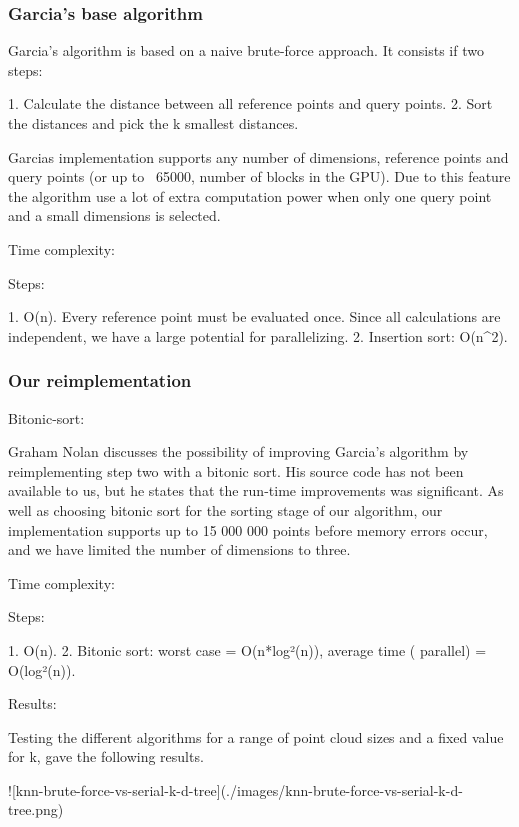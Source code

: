 \subsubsection{Garcia's base algorithm} %
\label{ssub:garcias_base_algorithme}

Garcia's algorithm is based on a naive brute-force approach. It consists if two steps:

1. Calculate the distance between all reference points and query points.
2. Sort the distances and pick the k smallest distances.

Garcias implementation supports any number of dimensions, reference points and query points (or up to ~65000, number of blocks in the GPU). Due to this feature the algorithm use a lot of extra computation power when only one query point and a small dimensions is selected.

Time complexity:

Steps:

1. O(n). Every reference point must be evaluated once. Since all calculations are independent, we have a large potential for parallelizing.
2. Insertion sort: O(n^2).

\subsubsection{Our reimplementation} %
\label{ssub:our_reimplementation}

Bitonic-sort:

Graham Nolan discusses the possibility of improving Garcia's algorithm by reimplementing step two with a bitonic sort. His source code has not been available to us, but he states that the run-time improvements was significant. As well as choosing bitonic sort for the sorting stage of our algorithm, our implementation supports up to 15 000 000 points before memory errors occur, and we have limited the number of dimensions to three.

Time complexity:

Steps:

1. O(n).
2. Bitonic sort: worst case = O(n*log²(n)), average time ( parallel) = O(log²(n)).

Results:

Testing the different algorithms for a range of point cloud sizes and a fixed value for k, gave the following results.

![knn-brute-force-vs-serial-k-d-tree](./images/knn-brute-force-vs-serial-k-d-tree.png)

